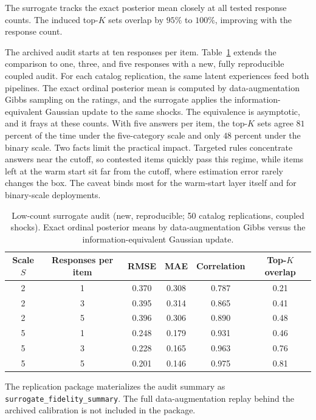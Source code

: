 \documentclass[11pt]{article}
\theoremstyle{definition}
\theoremstyle{remark}
\newcommand{\1}{\mathbf{1}}
\begin{document}
The surrogate tracks the exact posterior mean closely at all tested
response counts. The induced top-\(K\) sets overlap by \(95\%\) to
\(100\%\), improving with the response count.

The archived audit starts at ten responses per item.
Table~\ref{tab:surrogate-lowcount} extends the comparison to one,
three, and five responses with a new, fully reproducible coupled
audit. For each catalog replication, the same latent experiences feed both pipelines. The exact ordinal
posterior mean is computed by
data-augmentation Gibbs sampling on the ratings, and the surrogate
applies the information-equivalent Gaussian update to the same shocks.
The equivalence is asymptotic, and it frays at these counts. With five
answers per item, the top-\(K\) sets agree \(81\) percent of the
time under the five-category scale and only \(48\) percent under the
binary scale. Two facts limit the practical impact. Targeted rules
concentrate answers near the cutoff, so contested items quickly pass
this regime, while items left at the warm start sit far from the cutoff,
where estimation error rarely changes the box. The caveat binds most
for the warm-start layer itself and for binary-scale deployments.

\begin{table}[h!]
\centering
\scriptsize
\setlength{\tabcolsep}{5pt}
\begin{tabular}{cccccc}
\toprule
Scale \(S\) & Responses per item & RMSE & MAE & Correlation & Top-\(K\) overlap \\
\midrule
2 & 1 & 0.370 & 0.308 & 0.787 & 0.21 \\
2 & 3 & 0.395 & 0.314 & 0.865 & 0.41 \\
2 & 5 & 0.396 & 0.306 & 0.890 & 0.48 \\
5 & 1 & 0.248 & 0.179 & 0.931 & 0.46 \\
5 & 3 & 0.228 & 0.165 & 0.963 & 0.76 \\
5 & 5 & 0.201 & 0.146 & 0.975 & 0.81 \\
\bottomrule
\end{tabular}
\caption{Low-count surrogate audit (new, reproducible; 50 catalog replications, coupled shocks). Exact ordinal posterior means by data-augmentation Gibbs versus the information-equivalent Gaussian update.}
\label{tab:surrogate-lowcount}
\end{table}

The replication package materializes the audit summary as
\texttt{surrogate\_fidelity\_summary}. The full data-augmentation
replay behind the archived calibration is not included in the package.
\end{document}
